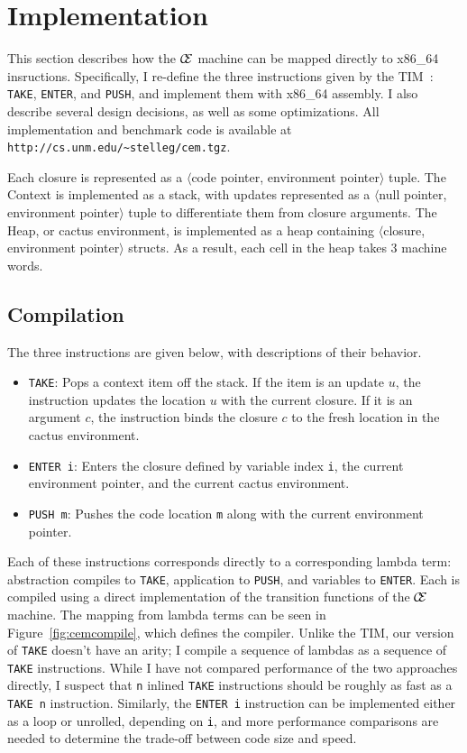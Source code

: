 \section{Implementation} \label{sec:impl}

This section describes how the $\mathcal{\mathcal{C} \mskip -4mu \mathcal{E}}$
machine can be mapped directly to x86\_64 insructions. Specifically, I re-define
the three instructions given by the TIM~\cite{TIM}: \texttt{TAKE},
\texttt{ENTER}, and \texttt{PUSH}, and implement them with x86\_64 assembly. I 
also describe several design decisions, as well as some optimizations. All
implementation and benchmark code is available at
\texttt{http://cs.unm.edu/\textasciitilde stelleg/cem.tgz}.

Each closure is represented as a $\langle$code pointer, environment
pointer$\rangle$ tuple. The
Context is implemented as a stack, with updates represented as a $\langle$null pointer,
environment pointer$\rangle$ tuple to differentiate them from closure arguments. The
Heap, or cactus environment, is implemented as a heap containing $\langle$closure,
environment pointer$\rangle$ structs. As a result, each cell in the heap takes 3
machine words.

\subsection{Compilation}
The three instructions are given below, with descriptions of their behavior. 

\begin{itemize}
\item \texttt{TAKE}: Pops a context item off the stack. If the item is an
update $u$, the instruction updates the location $u$ with the current closure.
If it is an argument $c$, the instruction binds the closure $c$ to the fresh
location in the cactus environment.
\item \texttt{ENTER i}: Enters the closure defined by variable index \texttt{i},
the current environment pointer, and the current cactus environment.  \item
\texttt{PUSH m}: Pushes the code location \texttt{m} along with the
current environment pointer. 
\end{itemize}

Each of these instructions corresponds directly to a corresponding lambda term:
abstraction compiles to \texttt{TAKE}, application to \texttt{PUSH}, and
variables to \texttt{ENTER}. Each is compiled using a direct implementation of
the transition functions of the $\mathcal{\mathcal{C} \mskip -4mu \mathcal{E}}$
machine. The mapping from lambda terms can be seen in
Figure~\ref{fig:cemcompile}, which defines the compiler. Unlike the TIM, our
version of \texttt{TAKE} doesn't have an arity; I compile a sequence of
lambdas as a sequence of \texttt{TAKE} instructions.  While I have not
compared performance of the two approaches directly, I suspect that \texttt{n}
inlined \texttt{TAKE} instructions should be roughly as fast as a \texttt{TAKE
n} instruction.  Similarly, the \texttt{ENTER i} instruction can be implemented
either as a loop or unrolled, depending on \texttt{i}, and more performance
comparisons are needed to determine the trade-off between code size and speed.

